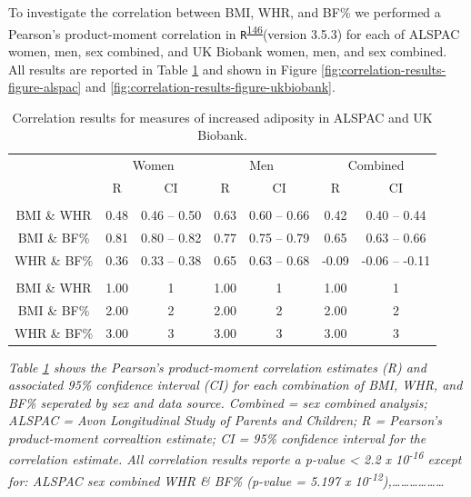 \documentclass[11pt,twoside]{bristolthesis}
\begin{document}
To investigate the correlation between BMI, WHR, and BF\% we performed a Pearson's product-moment correlation in \texttt{R}\textsuperscript{\protect\hyperlink{ref-r2019}{146}}(version 3.5.3) for each of ALSPAC women, men, sex combined, and UK Biobank women, men, and sex combined. All results are reported in Table \ref{tab:correlation-results} and shown in Figure \ref{fig:correlation-results-figure-alspac} and \ref{fig:correlation-results-figure-ukbiobank}.
\begin{longtable}[t]{ccccccc}
\caption{\label{tab:correlation-results}Correlation results for measures of increased adiposity in ALSPAC and UK Biobank.}\\
\toprule
\multicolumn{1}{c}{ } & \multicolumn{2}{c}{Women} & \multicolumn{2}{c}{Men} & \multicolumn{2}{c}{Combined} \\
\cmidrule(l{3pt}r{3pt}){2-3} \cmidrule(l{3pt}r{3pt}){4-5} \cmidrule(l{3pt}r{3pt}){6-7}
 & R & CI & R & CI & R & CI\\
\midrule
\addlinespace[0.3em]
\multicolumn{7}{l}{\textbf{ALSPAC}}\\
\hspace{1em}BMI \& WHR & 0.48 & 0.46 -- 0.50 & 0.63 & 0.60 -- 0.66 & 0.42 & 0.40 -- 0.44\\
\hspace{1em}BMI \& BF\% & 0.81 & 0.80 -- 0.82 & 0.77 & 0.75 -- 0.79 & 0.65 & 0.63 -- 0.66\\
\hspace{1em}WHR \& BF\% & 0.36 & 0.33 -- 0.38 & 0.65 & 0.63 -- 0.68 & -0.09 & -0.06 -- -0.11\\
\addlinespace[0.3em]
\multicolumn{7}{l}{\textbf{UK Biobank}}\\
\hspace{1em}\hspace{1em}BMI \& WHR & 1.00 & 1 & 1.00 & 1 & 1.00 & 1\\
\hspace{1em}\hspace{1em}BMI \& BF\% & 2.00 & 2 & 2.00 & 2 & 2.00 & 2\\
\hspace{1em}\hspace{1em}WHR \& BF\% & 3.00 & 3 & 3.00 & 3 & 3.00 & 3\\
\bottomrule
\end{longtable}
\emph{Table \ref{tab:correlation-results} shows the Pearson's product-moment correlation estimates (R) and associated 95\% confidence interval (CI) for each combination of BMI, WHR, and BF\% seperated by sex and data source. Combined = sex combined analysis; ALSPAC = Avon Longitudinal Study of Parents and Children; R = Pearson's product-moment correaltion estimate; CI = 95\% confidence interval for the correlation estimate. All correlation results reporte a p-value \textless{} 2.2 x 10\textsuperscript{-16} except for: ALSPAC sex combined WHR \& BF\% (p-value = 5.197 x 10\textsuperscript{-12}),\ldots{}\ldots{}\ldots{}\ldots{}\ldots{}\ldots{} }
\end{document}
